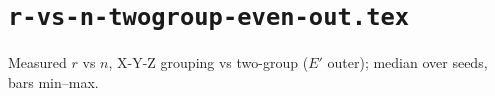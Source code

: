\documentclass{article}
\begin{document}
\section*{\texttt{r-vs-n-twogroup-even-out.tex}}
Measured $r$ vs $n$, X-Y-Z grouping vs two-group ($E'$ outer); median over seeds, bars min--max.\par\medskip

\end{document}
